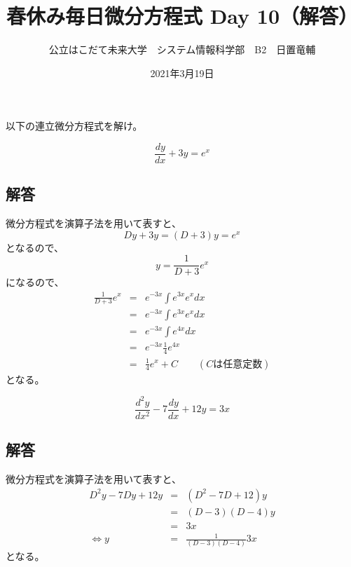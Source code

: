 \documentclass[dvipdfmx,uplatex]{jsarticle}
\title{春休み毎日微分方程式 Day 10（解答）}
\author{公立はこだて未来大学　システム情報科学部　B2　日置竜輔}
\date{2021年3月19日}
\begin{document}
\begin{spacing}{1.6}
\maketitle

以下の連立微分方程式を解け。\\
\begin{qparts}
  \qpart
  \begin{equation*}
    \frac{dy}{dx} + 3y = e ^ x
  \end{equation*}

  \subsection*{解答}

  微分方程式を演算子法を用いて表すと、
  \begin{equation*}
    Dy + 3y = (D + 3)y = e ^ x
  \end{equation*}
  となるので、
  \begin{equation*}
    y = \frac{1}{D + 3}e ^ x
  \end{equation*}
  になるので、
  \begin{eqnarray*}
    \frac{1}{D + 3}e ^ x & = & e ^ {-3x} \int e ^ {3x} e ^ x dx \\
    & = & e ^ {-3x} \int e ^ {3x} e ^ x dx \\
    & = & e ^ {-3x} \int e ^ {4x} dx \\
    & = & e ^ {-3x} \frac{1}{4}e ^ {4x} \\
    & = & \frac{1}{4}e ^ x + C \qquad (Cは任意定数)
  \end{eqnarray*}
  となる。

  \newpage

  \qpart
  \begin{equation*}
    \frac{d^2y}{dx^2} - 7 \frac{dy}{dx} + 12y = 3x
  \end{equation*}

  \subsection*{解答}

  微分方程式を演算子法を用いて表すと、
  \begin{eqnarray*}
    D ^ 2y - 7Dy + 12y & = & (D ^ 2 - 7D + 12)y \\
    & = & (D - 3)(D - 4)y \\
    & = & 3x \\
    \Leftrightarrow
    y & = & \frac{1}{(D - 3)(D - 4)}3x
   \end{eqnarray*}
   となる。\\


\end{qparts}
\end{spacing}
\end{document}
